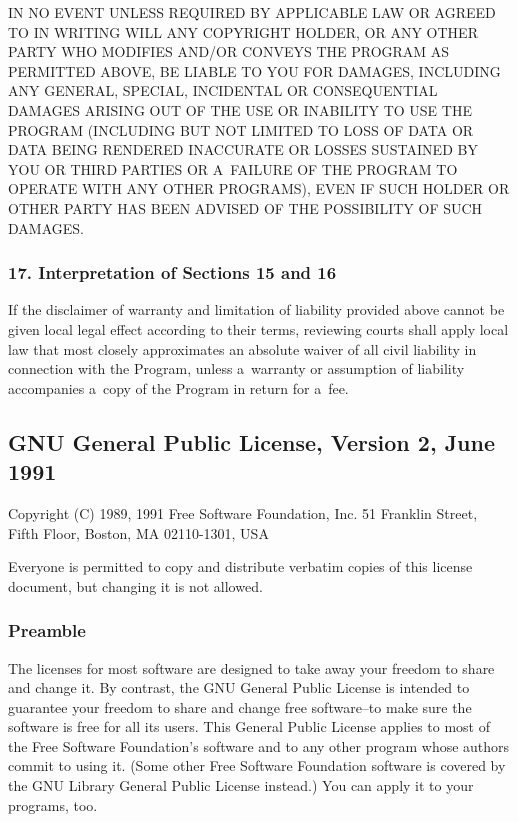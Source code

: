 \documentclass[a4paper, 11pt, twoside]{article}
\begin{document}
IN NO EVENT UNLESS REQUIRED BY APPLICABLE LAW OR AGREED TO IN WRITING WILL ANY COPYRIGHT HOLDER, OR ANY OTHER PARTY WHO MODIFIES AND/OR CONVEYS THE PROGRAM AS PERMITTED ABOVE, BE LIABLE TO YOU FOR DAMAGES, INCLUDING ANY GENERAL, SPECIAL, INCIDENTAL OR CONSEQUENTIAL DAMAGES ARISING OUT OF THE USE OR INABILITY TO USE THE PROGRAM (INCLUDING BUT NOT LIMITED TO LOSS OF DATA OR DATA BEING RENDERED INACCURATE OR LOSSES SUSTAINED BY YOU OR THIRD PARTIES OR A~FAILURE OF THE PROGRAM TO OPERATE WITH ANY OTHER PROGRAMS), EVEN IF SUCH HOLDER OR OTHER PARTY HAS BEEN ADVISED OF THE POSSIBILITY OF SUCH DAMAGES.

\subsubsection{17. Interpretation of Sections 15 and 16}

If the disclaimer of warranty and limitation of liability provided above cannot be given local legal effect according to their terms, reviewing courts shall apply local law that most closely approximates an absolute waiver of all civil liability in connection with the Program, unless a~warranty or assumption of liability accompanies a~copy of the Program in return for a~fee.

\subsection{GNU General Public License, Version 2, June 1991}

Copyright (C) 1989, 1991 Free Software Foundation, Inc. 51 Franklin Street, Fifth Floor, Boston, MA  02110-1301, USA

Everyone is permitted to copy and distribute verbatim copies of this license document, but changing it is not allowed.

\subsubsection{Preamble}

The licenses for most software are designed to take away your freedom to share and change it. By contrast, the GNU General Public License is intended to guarantee your freedom to share and change free software--to make sure the software is free for all its users. This General Public License applies to most of the Free Software Foundation's software and to any other program whose authors commit to using it. (Some other Free Software Foundation software is covered by the GNU Library General Public License instead.) You can apply it to your programs, too.
\end{document}
